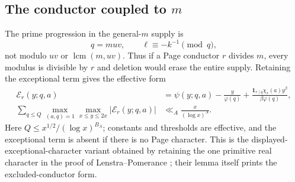 \documentclass[10pt,reqno]{amsart}
\theoremstyle{definition}
\newcommand{\lcm}{\operatorname {lcm}}
\newcommand{\1}{\mathbf 1}
\begin{document}
\subsection{The conductor coupled to $m$}\label{sec:m-effectivity}
The prime progression in the general-$m$ supply is
\begin{equation}\tag{55.14}
                  q=muv,\qquad \ell\equiv-k^{-1}\pmod q,
\end{equation}
not modulo $uv$ or $\lcm(m,uv)$.  Thus if a Page conductor $r$ divides
$m$, every modulus is divisible by $r$ and deletion would erase the entire
supply.  Retaining the exceptional term gives the effective form
\begin{equation}\tag{55.15}
 \begin{aligned}
 \mathcal E_r(y;q,a)&=\psi(y;q,a)-\frac y{\varphi(q)}
 +\frac{\1_{r\mid q}\chi_r(a)y^\beta}{\beta\varphi(q)},\\
 \sum_{q\leq Q}\max_{(a,q)=1}\max_{x\leq y\leq2x}
 |\mathcal E_r(y;q,a)|&\ll_A\frac x{(\log x)^A}.
 \end{aligned}
\end{equation}
Here $Q\leq x^{1/2}/(\log x)^{B_A}$; constants and thresholds are
effective, and the exceptional term is absent if there is no Page
character.  This is the displayed-exceptional-character variant obtained by
retaining the one primitive real character in the proof of
Lenstra--Pomerance \cite[Lemma~11.2]{LenstraPomerance}; their lemma itself
prints the excluded-conductor form.
\end{document}
